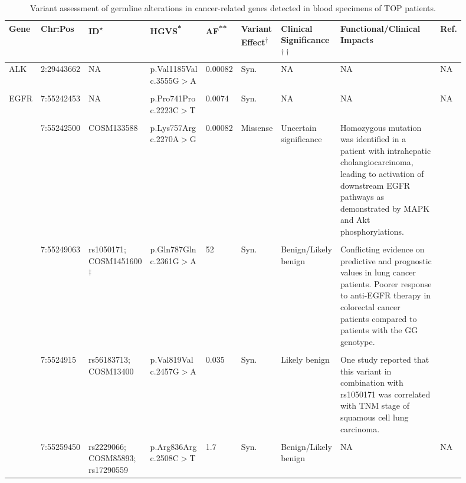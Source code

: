 
\begin{landscape}

\begin{longtable}{p{0.07\linewidth}|p{0.09\linewidth}p{0.11\linewidth}p{0.1\linewidth}p{0.05\linewidth}p{0.065\linewidth}p{0.11\linewidth}p{0.25\linewidth}p{0.05\linewidth}}
		\caption{Variant assessment of germline alterations in cancer-related genes detected in blood specimens of TOP patients.}
    \label{tbl:germline_cancer_genes}
		\\
    \hline
    Gene & Chr:Pos & ID\textsuperscript{$\star$} & HGVS\textsuperscript{*} & AF\textsuperscript{**} & Variant Effect\textsuperscript{$\dagger$} & Clinical Significance\textsuperscript{$\dagger\dagger$} & Functional/Clinical Impacts & Ref.
		\\
    \hline
		ALK & 2:29443662 & NA & p.Val1185Val c.3555G$>$A & 0.00082 & Syn. & NA & NA & NA
		\\
		\\
		\hline
		EGFR & 7:55242453 & NA & p.Pro741Pro c.2223C$>$T & 0.0074 & Syn. & NA & NA & NA
		\\
		\\
		& 7:55242500 & COSM133588 & p.Lys757Arg c.2270A$>$G & 0.00082 & Missense & Uncertain \mbox{significance} & Homozygous mutation was identified in a patient with intrahepatic cholangiocarcinoma, leading to activation of downstream EGFR pathways as demonstrated by MAPK and Akt phosphorylations. & \cite{Leone2006}
		\\
		\\
		& 7:55249063 & rs1050171; COSM1451600\textsuperscript{$\ddagger$} & p.Gln787Gln c.2361G$>$A & 52 & Syn. & Benign/Likely benign & Conflicting evidence on predictive and prognostic values in lung cancer patients. Poorer response to anti-EGFR therapy in colorectal cancer patients compared to patients with the GG genotype. & \cite{Zhang2006a, Leichsenring2017, Wang2013, Bonin2016}
		\\
		\\
		& 7:5524915 & rs56183713; COSM13400 & p.Val819Val c.2457G$>$A & 0.035 & Syn. & Likely benign & One study reported that this variant in combination with rs1050171 was correlated with TNM stage of squamous cell lung carcinoma. & \cite{Wang2013}
		\\
		\\
		& 7:55259450 & rs2229066; COSM85893; rs17290559 & p.Arg836Arg c.2508C$>$T & 1.7 & Syn. & Benign/Likely benign & NA & NA

\end{longtable}
\end{landscape}

